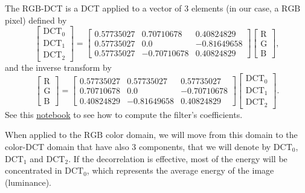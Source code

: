 The $\text{RGB}$-DCT is a DCT applied to a vector of $3$ elements (in
our case, a $\text{RGB}$ pixel) defined by
\begin{equation}
  \begin{bmatrix}
    \text{DCT}_0 \\
    \text{DCT}_1 \\
    \text{DCT}_2
  \end{bmatrix}
  =
  \begin{bmatrix}
    0.57735027 & 0.70710678 & 0.40824829 \\
    0.57735027 & 0.0 & -0.81649658 \\
    0.57735027 & -0.70710678 & 0.40824829
  \end{bmatrix}
  \begin{bmatrix}
    \text{R} \\
    \text{G} \\
    \text{B}
  \end{bmatrix},
\end{equation}
and the inverse transform by
\begin{equation}
  \begin{bmatrix}
    \text{R} \\
    \text{G} \\
    \text{B}
  \end{bmatrix}
  =
  \begin{bmatrix}
    0.57735027 & 0.57735027 & 0.57735027 \\
    0.70710678 & 0.0 & -0.70710678 \\
    0.40824829 & -0.81649658 & 0.40824829
  \end{bmatrix}
  \begin{bmatrix}
    \text{DCT}_0 \\
    \text{DCT}_1 \\
    \text{DCT}_2
  \end{bmatrix}.
\end{equation}
See this
\href{https://github.com/Sistemas-Multimedia/Sistemas-Multimedia.github.io/blob/master/milestones/06-YUV_compression/color-DCT_matrix.ipynb}{notebook}
to see how to compute the filter's coefficients.

When applied to the $\text{RGB}$ color domain, we will move from this
domain to the color-DCT domain that have also 3 components, that we
will denote by $\text{DCT}_0$, $\text{DCT}_1$ and $\text{DCT}_2$. If
the decorrelation is effective, most of the energy will be
concentrated in $\text{DCT}_0$, which represents the average energy of
the image (luminance).

